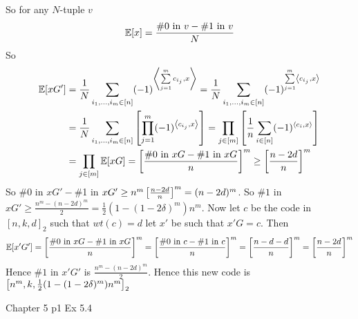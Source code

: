 \documentclass[a4paper, 11pt]{article}
\begin{document}
{\begin{enumerate}[label=(\alph*)]
		So for any $N$-tuple $v$ $$\mathbb{E}[x]=\frac{\#\text{0 in $v$}-\#\text{1 in $v$}}{N}$$So \begin{align*}
			\mathbb{E}[xG'] & = \frac{1}{N}\sum_{i_1,\dots,i_m\in [n]}(-1)^{\left\langle\sum\limits_{j=1}^m  c_{i_j},x\right\rangle} = \frac{1}{N}\sum_{i_1,\dots,i_m\in [n]}(-1)^{\sum\limits_{j=1}^m  \left\langle c_{i_j},x\right\rangle} \\
			          & = \frac{1}{N}\sum_{i_1,\dots,i_m\in [n]}\left[ \prod_{j=1}^m (-1)^{\left\langle c_{i_j},x\right\rangle}\right]  = \prod_{j\in [m]}\left[\frac1n\sum_{i\in [n]}(-1)^{\langle c_i,x\rangle}  \right]                  \\
			          & = \prod_{j\in [m]} \mathbb{E}[xG]= \left[\frac{\#\text{0 in $xG$}-\#\text{1 in $xG$}}{n}  \right]^m\geq \left[ \frac{n-2d}{n}\right]^m
		\end{align*}So $\#$0 in $xG'-\#$1 in $xG'\geq n^m\left[ \frac{n-2d}{n}\right]^m=(n-2d)^m$. So $\#1$ in $xG'\geq \frac{n^m-(n-2d)^m}{2}=\frac12(1-(1-2\delta)^m)n^m$. Now let $c$ be the code in $[n,k,d]_2$ such that $wt(c)=d$ let $x'$ be such that $x'G=c$. Then $$\mathbb{E}[x'G']=\left[\frac{\#\text{0 in $xG$}-\#\text{1 in $xG$}}{n}  \right]^m=\left[\frac{\#\text{0 in $c$}-\#\text{1 in $c$}}{n}  \right]^m=\left[\frac{n-d-d}{n}  \right]^m=\left[\frac{n-2d}{n}\right]^m$$Hence $\#1$ in $x'G'$ is $\frac{n^m-(n-2d)^m}{2}$. Hence this new code is $\left[n^m,k,\frac12(1-(1-2\delta)^m)n^m\right]_2$
	\end{enumerate}
}


\begin{problem}{%
		Chapter 5
	}{p1
	}
	Ex 5.4	
\end{problem}
\end{document}
